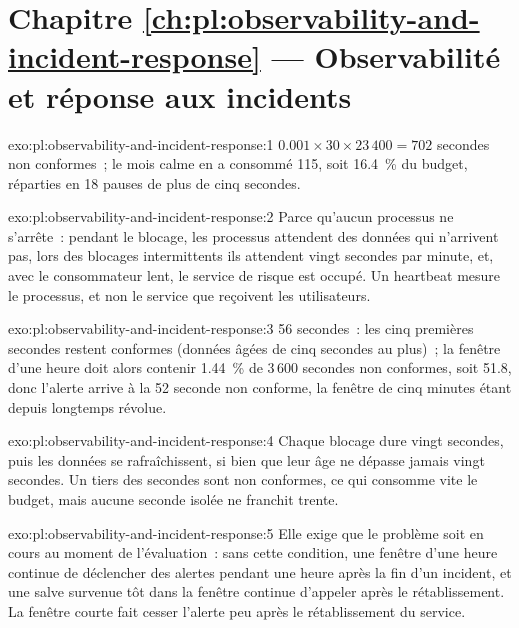 \section*{Chapitre \ref{ch:pl:observability-and-incident-response} --- Observabilité et réponse aux incidents}

\begin{solution}{exo:pl:observability-and-incident-response:1}
$0.001 \times 30 \times 23\,400 = 702$ secondes non conformes~; le mois calme en a consommé 115, soit 16.4~\% du budget, réparties en 18 pauses de plus de cinq secondes.
\end{solution}

\begin{solution}{exo:pl:observability-and-incident-response:2}
Parce qu'aucun processus ne s'arrête~: pendant le blocage, les processus attendent des données qui n'arrivent pas, lors des blocages intermittents ils attendent vingt secondes par
minute, et, avec le consommateur lent, le service de risque est occupé. Un heartbeat mesure le processus, et non le service que reçoivent les utilisateurs.
\end{solution}

\begin{solution}{exo:pl:observability-and-incident-response:3}
56 secondes~: les cinq premières secondes restent conformes (données âgées de cinq secondes au plus)~; la fenêtre d'une heure doit alors contenir 1.44~\% de 3\,600 secondes non conformes,
soit 51.8, donc l'alerte arrive à la 52 seconde non conforme, la fenêtre de cinq minutes étant depuis longtemps révolue.
\end{solution}

\begin{solution}{exo:pl:observability-and-incident-response:4}
Chaque blocage dure vingt secondes, puis les données se rafraîchissent, si bien que leur âge ne dépasse jamais vingt secondes. Un tiers des secondes sont non conformes, ce qui
consomme vite le budget, mais aucune seconde isolée ne franchit trente.
\end{solution}

\begin{solution}{exo:pl:observability-and-incident-response:5}
Elle exige que le problème soit en cours au moment de l'évaluation~: sans cette condition, une fenêtre d'une heure continue de déclencher des alertes pendant une heure après la fin d'un incident, et
une salve survenue tôt dans la fenêtre continue d'appeler après le rétablissement. La fenêtre courte fait cesser l'alerte peu après le rétablissement du service.
\end{solution}

